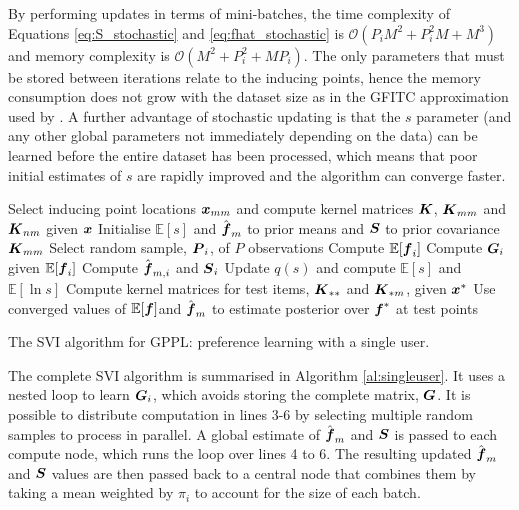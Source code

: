 By performing updates in terms of mini-batches, 
the time complexity of Equations \ref{eq:S_stochastic} and
\ref{eq:fhat_stochastic} is
$\mathcal{O}(P_i M^2 + P_i^2 M + M^3)$ and
memory complexity is  $\mathcal{O}(M^2 + P_i^2 + M P_i)$.
The only parameters that must be stored between iterations relate to the 
inducing points, hence the memory consumption does not grow with the dataset size 
as in the GFITC approximation used by \citet{houlsby2012collaborative}.
A further advantage of stochastic updating is that the $s$ parameter (and any other global
parameters not immediately depending on the data) can be learned
before the entire dataset has been processed,
which means that poor initial estimates of $s$ are rapidly improved
and the algorithm can converge faster.

\begin{algorithm}
 \nl Select inducing point locations $\boldsymbol x_{mm}$ and compute kernel matrices $\boldsymbol K$, $\boldsymbol K_{mm}$ and $\boldsymbol K_{nm}$ given $\boldsymbol x$ \;
 \nl Initialise $\mathbb{E}[s]$ and $\hat{\boldsymbol f}_m$ to prior means
 and $\boldsymbol S$ to prior covariance $\boldsymbol K_{mm}$\;
 {
 \nl Select random sample, $\boldsymbol P_i$, of $P$ observations\;
  {
  \nl Compute $\mathbb{E}[\boldsymbol f_i]$ \;
  \nl Compute $\boldsymbol G_i$ given $\mathbb{E}[\boldsymbol f_i]$ \;
  \nl Compute $\hat{\boldsymbol f}_{m,i}$ and $\boldsymbol S_{i}$ \;
  }
 \nl Update $q(s)$ and compute $\mathbb{E}[s]$ and $\mathbb{E}[\ln s]$\;
 }
\nl Compute kernel matrices for test items, $\boldsymbol K_{**}$ and $\boldsymbol K_{*m}$, given $\boldsymbol x^*$ \;
\nl Use converged values of $\mathbb{E}[\boldsymbol f]$and $\hat{\boldsymbol f}_m$ to estimate
posterior over $\boldsymbol f^*$ at test points \;
\vspace{0.2cm}
\caption{The SVI algorithm for GPPL: preference learning with a single user.}
\label{al:singleuser}
\end{algorithm}
The complete SVI algorithm is summarised in Algorithm \ref{al:singleuser}.
It uses a nested loop to learn $\boldsymbol G_i$, which avoids storing the complete matrix, 
$\boldsymbol G$.
It is possible to distribute computation in lines 3-6 by selecting multiple random samples
to process in parallel. A global estimate of $\hat{\boldsymbol f}_m$ and $\boldsymbol S$
is passed to each compute node, which runs the loop over lines 4 to 6.
The resulting updated $\hat{\boldsymbol f}_m$ and $\boldsymbol S$ values are then passed back to a 
central node that combines them by taking a mean weighted by $\pi_i$ to account for 
the size of each batch. 

